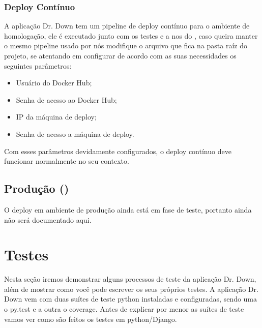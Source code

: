 \documentclass[letterpaper,10pt,english]{sphinxmanual}
\begin{document}
\subsection{Deploy Contínuo}
\label{\detokenize{deploy:deploy-continuo}}
A aplicação Dr. Down tem um pipeline de deploy contínuo para o ambiente de homologação, ele é executado junto com os testes e a  nos  do , caso queira manter o mesmo pipeline usado por nós modifique o arquivo  que fica na pasta raíz do projeto, se atentando em configurar de acordo com as suas necessidades os seguintes parâmetros:
\begin{itemize}
\item {} 
Usuário do Docker Hub;

\item {} 
Senha de acesso ao Docker Hub;

\item {} 
IP da máquina de deploy;

\item {} 
Senha de acesso a máquina de deploy.

\end{itemize}

Com esses parâmetros devidamente configurados, o deploy contínuo deve funcionar normalmente no seu contexto.


\section{Produção ()}
\label{\detokenize{deploy:producao-production}}
O deploy em ambiente de produção ainda está em fase de teste, portanto ainda não será documentado aqui.


\chapter{Testes}
\label{\detokenize{tests::doc}}\label{\detokenize{tests:testes}}
Nesta seção iremos demonstrar alguns processos de teste da aplicação Dr. Down, além de mostrar como você pode escrever os seus próprios testes.
A aplicação Dr. Down vem com duas suítes de teste python instaladas e configuradas, sendo uma o py.test e a outra o coverage.
Antes de explicar por menor as suítes de teste vamos ver como são feitos os testes em python/Django.
\end{document}
